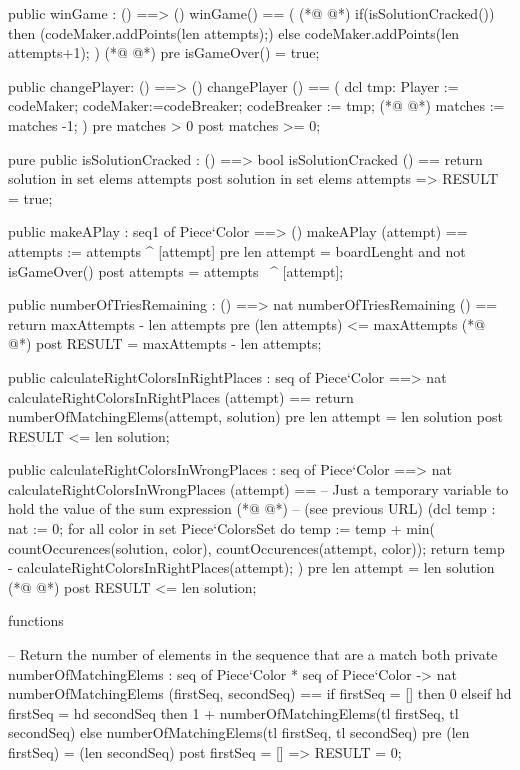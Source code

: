 \begin{vdmpp}[breaklines=true]
  public winGame : () ==> ()
   winGame() == (
(*@
\label{numberOfTriesRemaining:70}
@*)
   if(isSolutionCracked()) then
   (codeMaker.addPoints(len attempts);)
   else
   codeMaker.addPoints(len attempts+1);
  )
(*@
\label{calculateRightColorsInRightPlaces:75}
@*)
  pre  isGameOver() = true;
  
  public changePlayer: () ==> ()
  changePlayer () == (
  dcl tmp:  Player := codeMaker;  
  codeMaker:=codeBreaker;
  codeBreaker := tmp;
(*@
\label{calculateRightColorsInWrongPlaces:82}
@*)
  matches := matches -1;
  )
  pre matches > 0
  post matches >= 0;
  
  
  pure public isSolutionCracked : () ==> bool
   isSolutionCracked () == return solution in set elems attempts
  post solution in set elems attempts => RESULT = true;  
    
  public makeAPlay : seq1 of Piece`Color ==> ()
   makeAPlay (attempt) == attempts := attempts ^ [attempt]
  pre len attempt = boardLenght and not isGameOver()
  post attempts = attempts~ ^ [attempt];    
  
  public numberOfTriesRemaining : () ==> nat
   numberOfTriesRemaining () == return maxAttempts - len attempts
  pre (len attempts) <= maxAttempts
(*@
\label{numberOfMatchingElems:100}
@*)
  post RESULT = maxAttempts - len attempts;
  
  public calculateRightColorsInRightPlaces : seq of Piece`Color ==> nat
   calculateRightColorsInRightPlaces (attempt) ==
    return numberOfMatchingElems(attempt, solution)
  pre len attempt = len solution
  post RESULT <= len solution;
   
   
  public calculateRightColorsInWrongPlaces : seq of Piece`Color ==> nat
   calculateRightColorsInWrongPlaces (attempt) ==
   -- Just a temporary variable to hold the value of the sum expression
(*@
\label{countOccurences:112}
@*)
   -- (see previous URL)
    (dcl temp : nat := 0;
     for all color in set Piece`ColorsSet do
      temp := temp +
       min(
        countOccurences(solution, color),
        countOccurences(attempt, color));
     return temp - calculateRightColorsInRightPlaces(attempt);
    )
  pre len attempt = len solution
(*@
\label{min:122}
@*)
  post RESULT <= len solution;

functions

  -- Return the number of elements in the sequence that are a match both
private numberOfMatchingElems : seq of Piece`Color * seq of Piece`Color -> nat
   numberOfMatchingElems (firstSeq, secondSeq) ==
    if firstSeq = [] then
     0
    elseif hd firstSeq = hd secondSeq then
     1 + numberOfMatchingElems(tl firstSeq, tl secondSeq)
    else
     numberOfMatchingElems(tl firstSeq, tl secondSeq)
   pre (len firstSeq) = (len secondSeq)
   post firstSeq = [] => RESULT = 0;


\end{vdmpp}
